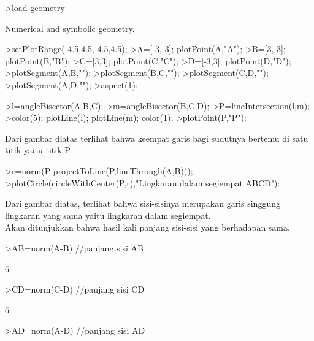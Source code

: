 \documentclass[a4paper,10pt]{article}
\begin{document}
\begin{eulernotebook}
\begin{eulercomment}
\begin{eulercomment}
\begin{eulerprompt}
>load geometry
\end{eulerprompt}
\begin{euleroutput}
  Numerical and symbolic geometry.
\end{euleroutput}
\begin{eulerprompt}
>setPlotRange(-4.5,4.5,-4.5,4.5);
>A=[-3,-3]; plotPoint(A,"A");
>B=[3,-3]; plotPoint(B,"B");
>C=[3,3]; plotPoint(C,"C");
>D=[-3,3]; plotPoint(D,"D");
>plotSegment(A,B,"");
>plotSegment(B,C,"");
>plotSegment(C,D,"");
>plotSegment(A,D,"");
>aspect(1):
\end{eulerprompt}
\begin{eulerprompt}
>l=angleBisector(A,B,C);
>m=angleBisector(B,C,D);
>P=lineIntersection(l,m);
>color(5); plotLine(l); plotLine(m); color(1);
>plotPoint(P,"P"):
\end{eulerprompt}
\begin{eulercomment}
Dari gambar diatas terlihat bahwa keempat garis bagi sudutnya bertemu
di satu titik yaitu titik P.
\end{eulercomment}
\begin{eulerprompt}
>r=norm(P-projectToLine(P,lineThrough(A,B)));
>plotCircle(circleWithCenter(P,r),"Lingkaran dalam segiempat ABCD"):
\end{eulerprompt}
\begin{eulercomment}
Dari gambar diatas, terlihat bahwa sisi-sisinya merupakan garis
singgung lingkaran yang sama yaitu lingkaran dalam segiempat.\\
Akan ditunjukkan bahwa hasil kali panjang sisi-sisi yang berhadapan
sama.
\end{eulercomment}
\begin{eulerprompt}
>AB=norm(A-B) //panjang sisi AB
\end{eulerprompt}
\begin{euleroutput}
  6
\end{euleroutput}
\begin{eulerprompt}
>CD=norm(C-D) //panjang sisi CD
\end{eulerprompt}
\begin{euleroutput}
  6
\end{euleroutput}
\begin{eulerprompt}
>AD=norm(A-D) //panjang sisi AD
\end{eulerprompt}

\end{eulercomment}
\end{eulercomment}
\end{eulernotebook}
\end{document}
